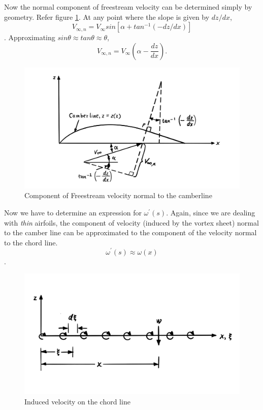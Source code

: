 \documentclass[letterpaper,12pt]{article}
\begin{document}
Now the normal component of freestream velocity can be determined simply by geometry. Refer figure \ref{norm-vel}. At any point where the slope is given by $dz/dx$, \[V_{\infty,n} = V_{\infty}  sin[ \alpha+tan^{-1}(-dz/dx) ]\]. Approximating $sin\theta \approx tan\theta \approx \theta$,
\begin{equation}
V_{\infty,n} = V_{\infty}\left(\alpha - \frac{dz}{dx}\right).
\label{v-inf-norm}
\end{equation}

\begin{figure}[H]
\includegraphics[scale=0.4]{1.3_v_infty}
\centering
\caption{Component of Freestream velocity normal to the camberline}
\label{norm-vel}
\end{figure}

Now we have to determine an expression for $\omega^{'}(s)$. Again, since we are dealing with \textit{thin} airfoils, the component of velocity (induced by the vortex sheet) normal to the camber line can be approximated to the component of the velocity normal to the chord line. \[\omega^{'}(s) \approx \omega(x)\].

\begin{figure}[H]
\includegraphics[scale=0.4]{1.4_vortexsheet_on_chord}
\centering
\caption{Induced velocity on the chord line}
\label{v-chord-2}
\end{figure}
\end{document}

